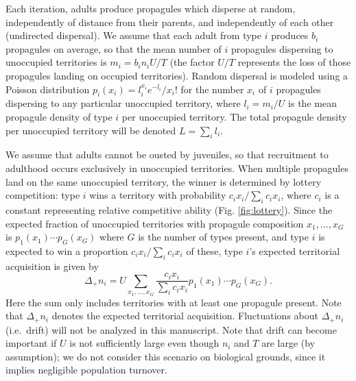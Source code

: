 \documentclass[12pt]{article}
\begin{document}
Each iteration, adults produce propagules which disperse at random, independently of distance from their parents, and independently of each other (undirected dispersal). We assume that each adult from type $i$ produces $b_i$ propagules on average, so that the mean number of $i$ propagules dispersing to unoccupied territories is $m_i=b_in_iU/T$ (the factor $U/T$ represents the loss of those propagules landing on occupied territories). Random dispersal is modeled using a Poisson distribution $p_i(x_i)=l_i^{x_i} e^{-l_i}/x_i!$ for the number $x_i$ of $i$ propagules dispersing to any particular unoccupied territory, where $l_i=m_i/U$ is the mean propagule density of type $i$ per unoccupied territory. The total propagule density per unoccupied territory will be denoted $L=\sum_i l_i$.

We assume that adults cannot be ousted by juveniles, so that recruitment to adulthood occurs exclusively in unoccupied territories. When multiple propagules land on the same unoccupied territory, the winner is determined by lottery competition: type $i$ wins a territory with probability $c_i x_i/\sum_i c_i x_i$, where $c_i$ is a constant representing relative competitive ability (Fig. \ref{fig:lottery}). Since the expected fraction of unoccupied territories with propagule composition $x_1,\ldots,x_G$ is $p_1(x_1)\cdots p_G(x_G)$ where $G$ is the number of types present, and type $i$ is expected to win a proportion $c_i x_i/\sum_i c_i x_i$ of these, type $i$'s expected territorial acquisition is given by
\begin{equation}
\Delta_+ n_i=U\sum_{x_1,\ldots,x_G} \frac{c_i x_i}{\sum_i c_i x_i} p_1(x_1)\cdots p_G(x_G). \label{eq:growthsumuncoupled}
\end{equation}
Here the sum only includes territories with at least one propagule present. Note that $\Delta_+ n_i$ denotes the expected territorial acquisition. Fluctuations about $\Delta_+ n_i$ (i.e.~drift) will not be analyzed in this manuscript. Note that drift can become important if $U$ is not sufficiently large even though $n_i$ and $T$ are large (by assumption); we do not consider this scenario on biological grounds, since it implies negligible population turnover.
\end{document}
